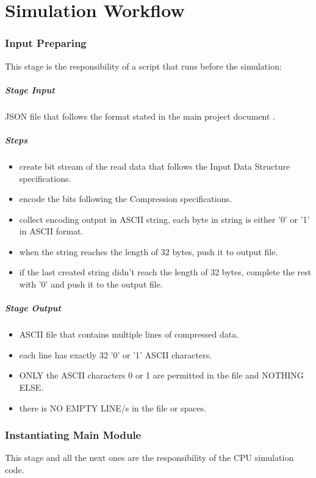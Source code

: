 \documentclass[12pt]{report}
\begin{document}
\part{Simulation Workflow}
\section{Input Preparing}
This stage is the responsibility of a script that runs before the simulation:
\subsubsection{Stage Input}
JSON file that follows the format stated in the main project document \cite{mainDoc}.

\subsubsection{Steps}
\begin{itemize}
    \item create bit stream of the read data that follows the {Input Data Structure} specifications.
    \item encode the bits following the {Compression} specifications.
    \item collect encoding output in ASCII string, each byte in string is either '0' or '1' in ASCII format.
    \item when the string reaches the length of 32 bytes, push it to output file.
    \item if the last created string didn't reach the length of 32 bytes, complete the rest with '0' and push it to the output file.    
\end{itemize}

\subsubsection{Stage Output}
\begin{itemize}
    \item ASCII file that contains multiple lines of compressed data.
    \item each line has exactly 32 '0' or '1' ASCII characters.
    \item ONLY the ASCII characters 0 or 1 are permitted in the file and NOTHING ELSE.
    \item there is NO EMPTY LINE/s in the file or spaces.
\end{itemize}

\section{Instantiating Main Module}
This stage and all the next ones are the responsibility of the CPU simulation code.
\end{document}
